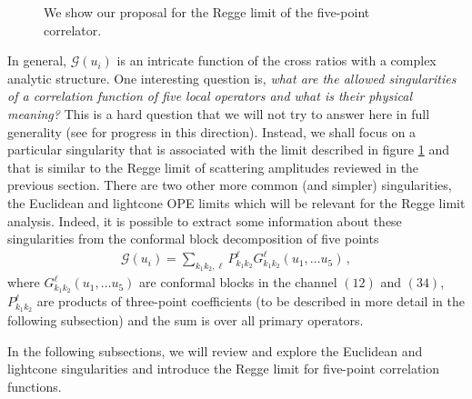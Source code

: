 \begin{figure}[t!]
\begin{subfigure}[]{0.5\textwidth}
{
    }
  \end{subfigure}
  \caption{
    We show our proposal for the Regge limit of the five-point correlator.
  }
  \label{fig:ReggeLimitVsOthers}
\end{figure}
In general, $\mathcal{G}(u_i)$ is an intricate function of the cross ratios with a complex analytic structure. One interesting question is, {\em what are the allowed singularities of a correlation function of five local operators and what is their physical meaning? }
This is a hard question that we will not try to answer here in full generality (see \cite{Maldacena:2015iua} for progress in this direction).
Instead, we shall focus on a particular singularity that is associated with the limit described in figure \ref{fig:ReggeLimitVsOthers} and that is similar to the Regge limit of scattering amplitudes reviewed in the previous section.
There are two other more common (and simpler) singularities, the Euclidean and lightcone OPE limits which will be relevant for the Regge limit analysis.
Indeed, it is possible to extract some information about these singularities from the conformal block decomposition of five points
\begin{align}
  \mathcal{G}(u_i)=  \sum_{k_1k_2,\ell}P_{k_1k_2 }^{\ell}G_{k_1k_2}^{\ell}(u_1,\dots u_5)\,,
  \label{eq:confblockDecom}
\end{align}
where $G_{k_1k_2}^{\ell}(u_1,\dots u_5)$ are conformal blocks in the channel $(12)$ and $(34)$, $P_{k_1k_2}^{\ell}$ are products of three-point coefficients (to be described in more detail in the following subsection) and the sum is over all primary operators.

In the following subsections, we will review and explore the Euclidean and lightcone singularities and introduce the Regge limit for five-point correlation functions.




